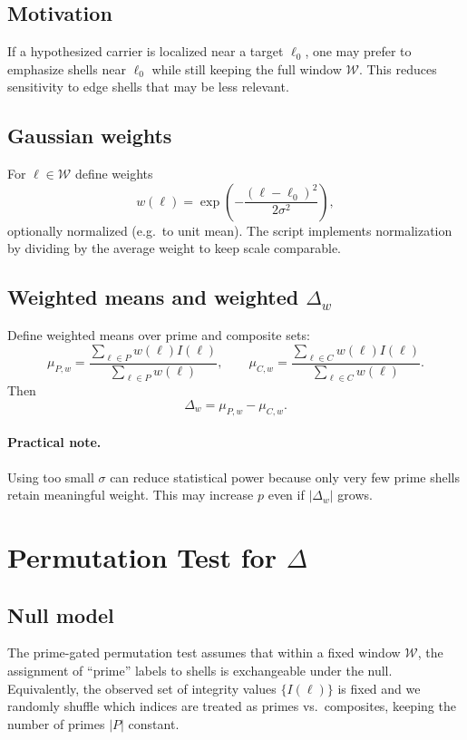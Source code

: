 \documentclass[11pt,a4paper]{article}
\begin{document}
\subsection{Motivation}
If a hypothesized carrier is localized near a target $\ell_0$, one may prefer
to emphasize shells near $\ell_0$ while still keeping the full window $\mathcal{W}$.
This reduces sensitivity to edge shells that may be less relevant.

\subsection{Gaussian weights}
For $\ell\in\mathcal{W}$ define weights
\begin{equation}
w(\ell)=\exp\!\left(-\frac{(\ell-\ell_0)^2}{2\sigma^2}\right),
\end{equation}
optionally normalized (e.g.\ to unit mean). The script implements normalization by
dividing by the average weight to keep scale comparable.

\subsection{Weighted means and weighted $\Delta_w$}
Define weighted means over prime and composite sets:
\begin{equation}
\mu_{P,w}=\frac{\sum_{\ell\in P} w(\ell)I(\ell)}{\sum_{\ell\in P} w(\ell)},\qquad
\mu_{C,w}=\frac{\sum_{\ell\in C} w(\ell)I(\ell)}{\sum_{\ell\in C} w(\ell)}.
\end{equation}
Then
\begin{equation}
\Delta_w = \mu_{P,w}-\mu_{C,w}.
\end{equation}

\paragraph{Practical note.}
Using too small $\sigma$ can reduce statistical power because only very few prime
shells retain meaningful weight. This may increase $p$ even if $|\Delta_w|$ grows.

\section{Permutation Test for $\Delta$}

\subsection{Null model}
The prime-gated permutation test assumes that within a fixed window $\mathcal{W}$,
the assignment of ``prime'' labels to shells is exchangeable under the null.
Equivalently, the observed set of integrity values $\{I(\ell)\}$ is fixed and we
randomly shuffle which indices are treated as primes vs.\ composites, keeping the
number of primes $|P|$ constant.
\end{document}
